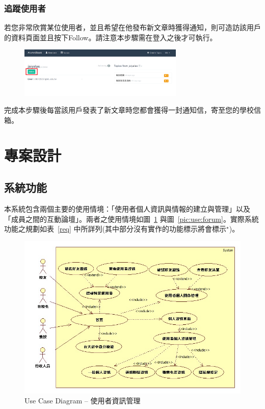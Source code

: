 \documentclass[12pt]{article}
\begin{document}
\subsubsection{追蹤使用者}
若您非常欣賞某位使用者，並且希望在他發布新文章時獲得通知，則可造訪該用戶的資料頁面並且按下Follow。請注意本步驟需在登入之後才可執行。
\begin{figure}[H]
\centering\includegraphics[width=0.7\textwidth]{img/user04.png}
\end{figure}
完成本步驟後每當該用戶發表了新文章時您都會獲得一封通知信，寄至您的學校信箱。

\begin{center}
\end{center}

\section{專案設計}

\subsection{系統功能}

本系統包含兩個主要的使用情境：「使用者個人資訊與情報的建立與管理」以及「成員之間的互動論壇」。兩者之使用情境如圖~\ref{pic:use:userLogin} 與圖~\ref{pic:use:forum}。實際系統功能之規劃如表~\ref{req} 中所詳列(其中部分沒有實作的功能標示將會標示$^\star$)。

\begin{figure}[H]
\centering
\includegraphics[width=.95\textwidth]{img/useseq/stage1/userProfile.jpg}
\caption{Use Case Diagram -- 使用者資訊管理}
\label{pic:use:userLogin}
\end{figure}
\end{document}
